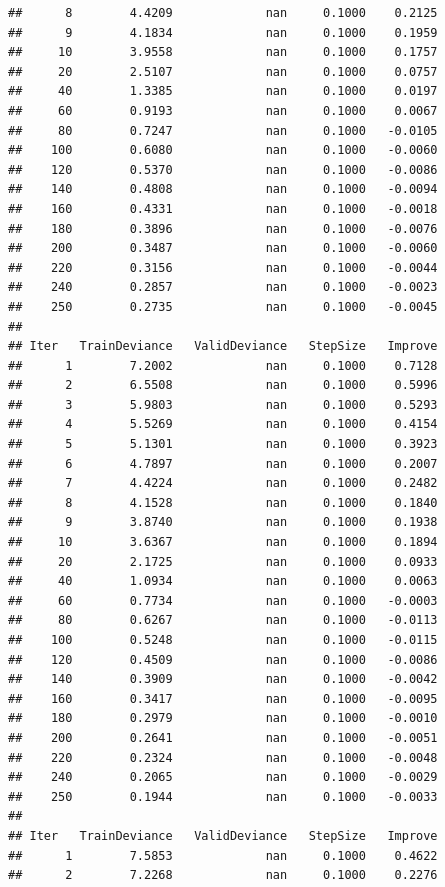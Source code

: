 \documentclass[
]{book}
\begin{document}
\begin{verbatim}
##      8        4.4209             nan     0.1000    0.2125
##      9        4.1834             nan     0.1000    0.1959
##     10        3.9558             nan     0.1000    0.1757
##     20        2.5107             nan     0.1000    0.0757
##     40        1.3385             nan     0.1000    0.0197
##     60        0.9193             nan     0.1000    0.0067
##     80        0.7247             nan     0.1000   -0.0105
##    100        0.6080             nan     0.1000   -0.0060
##    120        0.5370             nan     0.1000   -0.0086
##    140        0.4808             nan     0.1000   -0.0094
##    160        0.4331             nan     0.1000   -0.0018
##    180        0.3896             nan     0.1000   -0.0076
##    200        0.3487             nan     0.1000   -0.0060
##    220        0.3156             nan     0.1000   -0.0044
##    240        0.2857             nan     0.1000   -0.0023
##    250        0.2735             nan     0.1000   -0.0045
## 
## Iter   TrainDeviance   ValidDeviance   StepSize   Improve
##      1        7.2002             nan     0.1000    0.7128
##      2        6.5508             nan     0.1000    0.5996
##      3        5.9803             nan     0.1000    0.5293
##      4        5.5269             nan     0.1000    0.4154
##      5        5.1301             nan     0.1000    0.3923
##      6        4.7897             nan     0.1000    0.2007
##      7        4.4224             nan     0.1000    0.2482
##      8        4.1528             nan     0.1000    0.1840
##      9        3.8740             nan     0.1000    0.1938
##     10        3.6367             nan     0.1000    0.1894
##     20        2.1725             nan     0.1000    0.0933
##     40        1.0934             nan     0.1000    0.0063
##     60        0.7734             nan     0.1000   -0.0003
##     80        0.6267             nan     0.1000   -0.0113
##    100        0.5248             nan     0.1000   -0.0115
##    120        0.4509             nan     0.1000   -0.0086
##    140        0.3909             nan     0.1000   -0.0042
##    160        0.3417             nan     0.1000   -0.0095
##    180        0.2979             nan     0.1000   -0.0010
##    200        0.2641             nan     0.1000   -0.0051
##    220        0.2324             nan     0.1000   -0.0048
##    240        0.2065             nan     0.1000   -0.0029
##    250        0.1944             nan     0.1000   -0.0033
## 
## Iter   TrainDeviance   ValidDeviance   StepSize   Improve
##      1        7.5853             nan     0.1000    0.4622
##      2        7.2268             nan     0.1000    0.2276

\end{verbatim}
\end{document}
